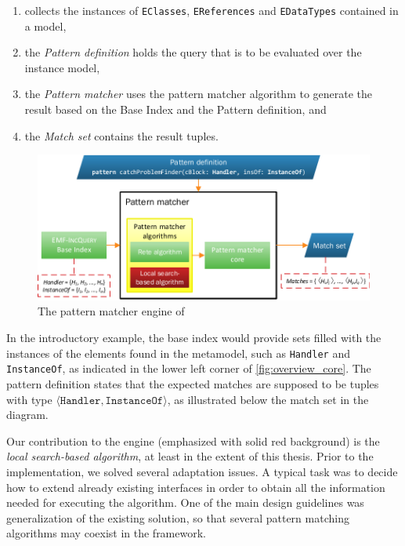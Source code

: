 \begin{enumerate}
	\item \emph{\baseindex} collects the instances of \texttt{EClasses}, \texttt{EReferences} and \texttt{EDataTypes} contained in a model,
	\item the \emph{Pattern definition} holds the query that is to be evaluated over the instance model, 
	\item the \emph{Pattern matcher} uses the pattern matcher algorithm to generate the result based on the \eiq Base Index and the Pattern definition, and
	\item the \emph{Match set} contains the result tuples.
\end{enumerate} 

\begin{figure}[!htp]
	\centering
	\includegraphics[width=\textwidth]{figures/pdfs/overview_core.pdf}
	\caption{The pattern matcher engine of \eiq}
	\label{fig:overview_core}
\end{figure}

In the introductory example, the base index would provide sets filled with the instances of the elements found in the metamodel, such as \texttt{Handler} and \texttt{InstanceOf}, as indicated in the lower left corner of \autoref{fig:overview_core}. The \catchproblem pattern definition states that the expected matches are supposed to be tuples with type $\langle \mathtt{Handler, InstanceOf}\rangle$, as illustrated below the match set in the diagram.

Our contribution to the engine (emphasized with solid red background) is the \emph{local search-based algorithm}, at least in the extent of this thesis. Prior to the implementation, we solved several adaptation issues.  A typical task was to decide how to extend already existing interfaces in order to obtain all the information needed for executing the algorithm. One of the main design guidelines was generalization of the existing solution, so that several pattern matching algorithms may coexist in the \eiq framework.

